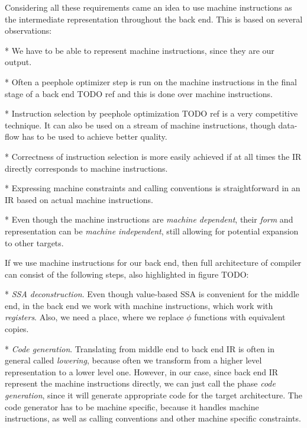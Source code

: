 Considering all these requirements came an idea to use machine instructions as
the intermediate representation throughout the back end. This is based on
several observations:


\begitems

* We have to be able to represent machine instructions, since they are our
output.

* Often a peephole optimizer step is run on the machine instructions in the
final stage of a back end TODO ref and this is done over machine instructions.

* Instruction selection by peephole optimization TODO ref is a very competitive
technique. It can also be used on a stream of machine instructions, though
data-flow has to be used to achieve better quality.

* Correctness of instruction selection is more easily achieved if at all times
the IR directly corresponds to machine instructions.

* Expressing machine constraints and calling conventions is straightforward in
an IR based on actual machine instructions.

* Even though the machine instructions are {\em machine dependent}, their {\em form}
and representation can be {\em machine independent}, still allowing for
potential expansion to other targets.

\enditems

If we use machine instructions for our back end, then full architecture of
compiler can consist of the following steps, also highlighted in figure TODO:

\begitems

* {\em SSA deconstruction}. Even though value-based SSA is convenient for the
middle end, in the back end we work with machine instructions, which work with
{\em registers}. Also, we need a place, where we replace $\phi$ functions with
equivalent copies.

* {\em Code generation}. Translating from middle end to back end IR is often
in general called {\em lowering}, because often we transform from a higher level
representation to a lower level one. However, in our case, since back end IR
represent the machine instructions directly, we can just call the phase {\em
code generation}, since it will generate appropriate code for the target
architecture. The code generator  has to be machine specific, because it handles
machine instructions, as well as calling conventions and other machine specific
constraints.

